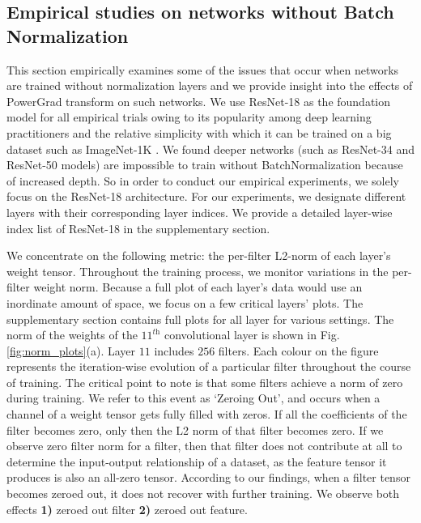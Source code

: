 \documentclass[times,sort&compress]{elsarticle}
\begin{document}
\subsection{Empirical studies on networks without Batch Normalization}
\label{sec:Empi}






This section empirically examines some of the issues that occur when networks are
trained without normalization layers and we provide insight into the effects of
PowerGrad transform on such networks. We use ResNet-18 \cite{he2016deep} as the
foundation model for all empirical trials owing to its popularity among deep learning
practitioners and the relative simplicity with which it can be trained on a big dataset
such as ImageNet-1K \cite{russakovsky2015imagenet}. We found deeper networks (such as
ResNet-34 and ResNet-50 models) are impossible to train without BatchNormalization
because of increased depth. So in order to conduct our empirical experiments, we solely
focus on the ResNet-18 architecture. For our experiments, we designate different layers
with their corresponding layer indices. We provide a detailed layer-wise index list of
ResNet-18 in the supplementary section.

We concentrate on the following metric: the per-filter L2-norm of each layer's weight
tensor. Throughout the training process, we monitor variations in the per-filter weight
norm. Because a full plot of each layer's data would use an inordinate amount of space,
we focus on a few critical layers' plots. The supplementary section contains full plots
for all layer for various settings. The norm of the weights of the $11^\textit{th}$
convolutional layer is shown in Fig. \ref{fig:norm_plots}(a). Layer $11$ includes $256$
filters. Each colour on the figure represents the iteration-wise evolution of a
particular filter throughout the course of training. The critical point to note is that
some filters achieve a norm of zero during training. We refer to this event as `Zeroing
Out', and occurs when a channel of a weight tensor gets fully filled with zeros. If all
the coefficients of the filter becomes zero, only then the L2 norm of that filter
becomes zero. If we observe zero filter norm for a filter, then that filter does not
contribute at all to determine the input-output relationship of a dataset, as the
feature tensor it produces is also an all-zero tensor. According to our findings, when a
filter tensor becomes zeroed out, it does not recover with further training. We observe
both effects \textbf{1)} zeroed out filter \textbf{2)} zeroed out feature.
\end{document}
